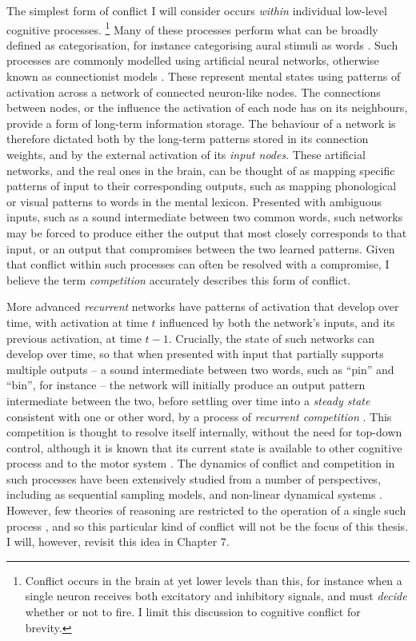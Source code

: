 The simplest form of conflict I will consider
occurs \emph{within} individual low-level cognitive processes.%
\footnote{
  Conflict occurs in the brain at yet lower levels than this,
  for instance when a single neuron receives
  both excitatory and inhibitory signals,
  and must \emph{decide} whether or not to fire.
  I limit this discussion to cognitive conflict for brevity.
  }
Many of these processes perform what can be broadly defined as categorisation,
for instance categorising aural stimuli as words
\citep{McClelland1986,Norris1994}.
Such processes are commonly
modelled using artificial neural networks,
otherwise known as connectionist models
\citep{McClelland1986, Rogers2004, Kruschke1992}.
These represent mental states using patterns of activation
across a network of connected neuron-like nodes.
The connections between nodes,
or the influence the activation of each node has on its neighbours,
provide a form of long-term information storage.
The behaviour of a network is therefore dictated
both by the long-term patterns stored in its connection weights,
and by the external activation of its \emph{input nodes}.
These artificial networks, and the real ones in the brain,
can be thought of as mapping
specific patterns of input to their corresponding outputs,
such as mapping phonological or visual patterns to words in the mental lexicon.
Presented with ambiguous inputs, such as a sound intermediate between two common words,
such networks may be forced to produce either
the output that most closely corresponds to that input,
or an output that compromises between the two learned patterns.
Given that conflict within such processes
can often be resolved with a compromise,
I believe the term \emph{competition}
accurately describes this form of conflict.

More advanced \emph{recurrent} networks
\citep{Elman1990}               %
have patterns of activation that develop over time,
with activation at time $t$ influenced by both the network's inputs,
and its previous activation, at time $t - 1$.
Crucially, the state of such networks can develop over time,
so that when presented with input that partially supports multiple outputs
-- a sound intermediate between two words, such as ``pin'' and ``bin'', for instance --
the network will initially produce an output pattern
intermediate between the two,
before settling over time into a \emph{steady state}
consistent with one or other word,
by a process of \emph{recurrent competition} \citep{Spivey2007}.
This competition is thought to resolve itself internally,
without the need for top-down control,
although it is known that its current state
is available to other cognitive process and to the motor system
\citep[i.e.][]{Spivey2005}.
The dynamics of conflict and competition in such processes
have been extensively studied from a number of perspectives,
including as sequential sampling models, %
and non-linear dynamical systems
\citep{Spivey2006, Spivey2007,Beer2000,Port1995,Freeman2011d}.
However, few theories of reasoning are restricted
to the operation of a single such process \citep[but see][]{Rogers2004},
and so this particular kind of conflict will not be the focus of this thesis.
I will, however, revisit this idea in Chapter 7.

